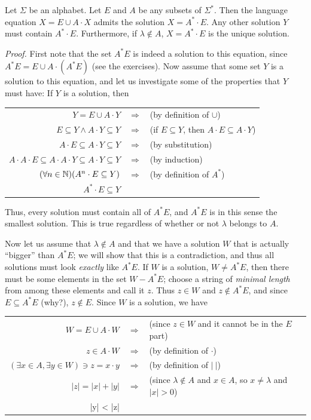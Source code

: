 \begin{thm}\label{thm-6.1}
Let $\Sigma$ be an alphabet. Let $E$ and $A$ be any subsets of $\Sigma^*$. Then
the language equation $X = E \cup A \cdot X$ admits the solution $X=A^*  \cdot E$.
Any other solution $Y$ must contain $A^*  \cdot E$.
Furthermore, if  $\lambda \notin A$, $X = A^*  \cdot E$ is the unique solution.

\emph{Proof.} First note that the set $A^*E$ is indeed a solution to this
equation, since $A^*E = E \cup A \cdot (A^*E)$ (see the exercises). Now assume
that some set $Y$ is a solution to this equation, and let us investigate some of
the properties that $Y$ must have: If $Y$ is a solution, then
\begin{center}\begin{tabular}{rcl}
$Y = E \cup A \cdot Y$ & $\Rightarrow$ & (by definition of $\cup$) \\
$E \subseteq Y \wedge A \cdot Y \subseteq Y$ & $\Rightarrow$ &
	(if $E \subseteq Y$, then $A \cdot E \subseteq A \cdot Y$) \\
$A \cdot E \subseteq A \cdot Y \subseteq Y$ & $\Rightarrow$ & (by substitution) \\
$A \cdot A \cdot E \subseteq A \cdot A \cdot Y \subseteq A \cdot Y \subseteq Y$
	& $\Rightarrow$ & (by induction) \\
$(\forall n \in \mathbb{N})(A^n \cdot E \subseteq Y)$ & $\Rightarrow$ & (by definition
	of $A^*$) \\
$A^*  \cdot E \subseteq Y$ &&
\end{tabular}\end{center}

Thus, every solution must contain all of $A^*E$, and $A^*E$ is in this sense the
smallest solution. This is true regardless of whether or not $\lambda$ belongs
to $A$.

Now let us assume that $\lambda \not \in A$ and that we have a solution $W$ that
is actually ``bigger'' than $A^*E$; we will show that this is a contradiction,
and thus all solutions must look \emph{exactly} like $A^*E$. If $W$ is a
solution, $W \not= A^*E$, then there must be some elements in the set $W-A^*E$;
choose a string of \emph{minimal length} from among these elements and call it
$z$. Thus $z \in W$ and $z \not \in A^*E$, and since $E \subseteq A^*E$ (why?),
$z \not \in E$. Since $W$ is a solution, we have
\begin{center}\begin{tabular}{rcl}
$W=E \cup A \cdot W$ & $\Rightarrow$ & (since $z \in W$ and it cannot be in the
	$E$ part) \\
$z \in A \cdot W$ & $\Rightarrow$ & (by definition of $\cdot$) \\
$(\exists x \in A,\exists y \in W) \ni z = x \cdot y$ & $\Rightarrow$ & (by
	definition of $|\ |$) \\
$|z| = |x| + |y|$ & $\Rightarrow$ & (since $\lambda \not \in A$ and $x \in A$, so
	$x \neq \lambda$ and $|x| > 0$) \\
|y| < |z|
\end{tabular}\end{center}


\end{thm}

